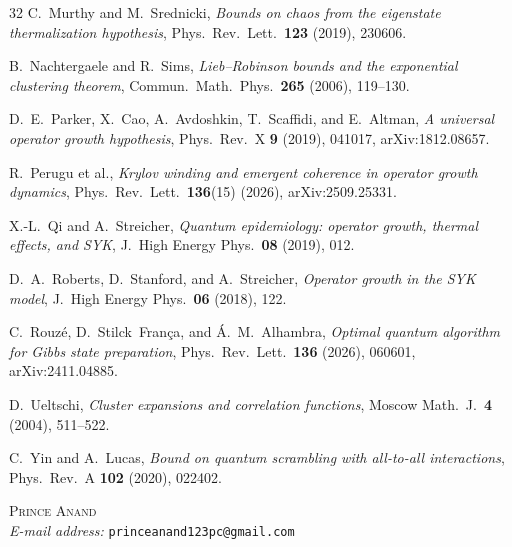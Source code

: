 \documentclass[11pt,a4paper]{article}
\numberwithin{equation}{section}
\theoremstyle{plain}
\theoremstyle{definition}
\begin{document}
\begin{thebibliography}{32}
C.~Murthy and M.~Srednicki,
\textit{Bounds on chaos from the eigenstate thermalization hypothesis},
Phys.\ Rev.\ Lett.\ \textbf{123} (2019), 230606.

B.~Nachtergaele and R.~Sims,
\textit{Lieb--Robinson bounds and the exponential clustering theorem},
Commun.\ Math.\ Phys.\ \textbf{265} (2006), 119--130.

D.~E.~Parker, X.~Cao, A.~Avdoshkin, T.~Scaffidi, and E.~Altman,
\textit{A universal operator growth hypothesis},
Phys.\ Rev.\ X \textbf{9} (2019), 041017, arXiv:1812.08657.

R.~Perugu et al.,
\textit{Krylov winding and emergent coherence in operator growth dynamics},
Phys.\ Rev.\ Lett.\ \textbf{136}(15) (2026), arXiv:2509.25331.

X.-L.~Qi and A.~Streicher,
\textit{Quantum epidemiology: operator growth, thermal effects, and SYK},
J.\ High Energy Phys.\ \textbf{08} (2019), 012.

D.~A.~Roberts, D.~Stanford, and A.~Streicher,
\textit{Operator growth in the SYK model},
J.\ High Energy Phys.\ \textbf{06} (2018), 122.

C.~Rouz\'e, D.~Stilck~Fran\c{c}a, and \'A.~M.~Alhambra,
\textit{Optimal quantum algorithm for Gibbs state preparation},
Phys.\ Rev.\ Lett.\ \textbf{136} (2026), 060601, arXiv:2411.04885.

D.~Ueltschi,
\textit{Cluster expansions and correlation functions},
Moscow Math.\ J.\ \textbf{4} (2004), 511--522.

C.~Yin and A.~Lucas,
\textit{Bound on quantum scrambling with all-to-all interactions},
Phys.\ Rev.\ A \textbf{102} (2020), 022402.

\end{thebibliography}

\vspace{16pt}
\noindent\textsc{Prince Anand}\\
\emph{E-mail address:} \texttt{princeanand123pc@gmail.com}
\end{document}
